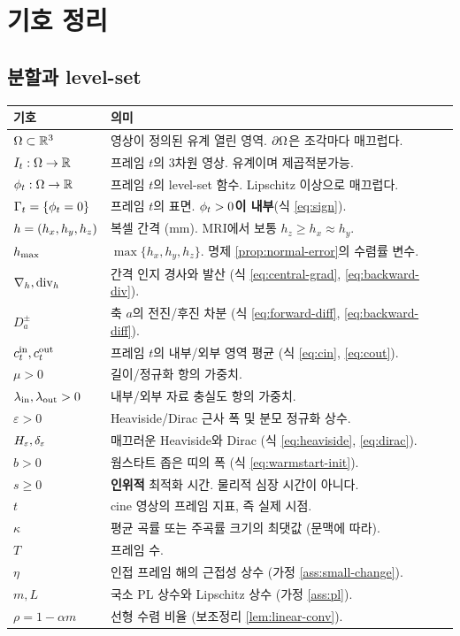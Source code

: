 \chapter{기호 정리}
\label{app:symbols}

\section{분할과 level-set}

\begin{longtable}{@{}lp{10.2cm}@{}}
\toprule
기호 & 의미 \\
\midrule
\endhead
$\Omega \subset \mathbb{R}^3$ & 영상이 정의된 유계 열린 영역. $\partial\Omega$은 조각마다 매끄럽다. \\
$I_t : \Omega \to \mathbb{R}$ & 프레임 $t$의 3차원 영상. 유계이며 제곱적분가능. \\
$\phi_t : \Omega \to \mathbb{R}$ & 프레임 $t$의 level-set 함수. Lipschitz 이상으로 매끄럽다. \\
$\Gamma_t = \{\phi_t = 0\}$ & 프레임 $t$의 표면. \textbf{$\phi_t>0$이 내부}(식 \eqref{eq:sign}). \\
$h = (h_x,h_y,h_z)$ & 복셀 간격 (mm). MRI에서 보통 $h_z \ge h_x \approx h_y$. \\
$h_{\max}$ & $\max\{h_x,h_y,h_z\}$. 명제 \ref{prop:normal-error}의 수렴률 변수. \\
$\nabla_h, \operatorname{div}_h$ & 간격 인지 경사와 발산 (식 \eqref{eq:central-grad}, \eqref{eq:backward-div}). \\
$D^\pm_a$ & 축 $a$의 전진/후진 차분 (식 \eqref{eq:forward-diff}, \eqref{eq:backward-diff}). \\
$c^{\mathrm{in}}_t, c^{\mathrm{out}}_t$ & 프레임 $t$의 내부/외부 영역 평균 (식 \eqref{eq:cin}, \eqref{eq:cout}). \\
$\mu > 0$ & 길이/정규화 항의 가중치. \\
$\lambda_{\mathrm{in}}, \lambda_{\mathrm{out}} > 0$ & 내부/외부 자료 충실도 항의 가중치. \\
$\varepsilon > 0$ & Heaviside/Dirac 근사 폭 및 분모 정규화 상수. \\
$H_\varepsilon, \delta_\varepsilon$ & 매끄러운 Heaviside와 Dirac (식 \eqref{eq:heaviside}, \eqref{eq:dirac}). \\
$b > 0$ & 웜스타트 좁은 띠의 폭 (식 \eqref{eq:warmstart-init}). \\
$s \ge 0$ & \textbf{인위적} 최적화 시간. 물리적 심장 시간이 아니다. \\
$t$ & cine 영상의 프레임 지표, 즉 실제 시점. \\
$\kappa$ & 평균 곡률 또는 주곡률 크기의 최댓값 (문맥에 따라). \\
$T$ & 프레임 수. \\
$\eta$ & 인접 프레임 해의 근접성 상수 (가정 \ref{ass:small-change}). \\
$m, L$ & 국소 PL 상수와 Lipschitz 상수 (가정 \ref{ass:pl}). \\
$\rho = 1-\alpha m$ & 선형 수렴 비율 (보조정리 \ref{lem:linear-conv}). \\
\bottomrule
\end{longtable}

